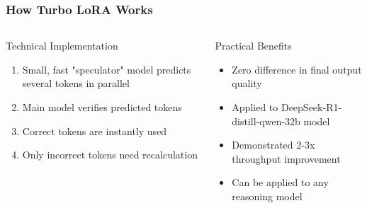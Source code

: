 \documentclass[aspectratio=169]{beamer}
\begin{document}
\begin{frame}[shrink=20]
	\frametitle{How Turbo LoRA Works}
	\begin{columns}[T]
		\begin{column}{0.48\textwidth}
			\begin{block}{Technical Implementation}
				\begin{enumerate}\setlength{\itemsep}{0.5em}
					\item Small, fast "speculator" model predicts several tokens in parallel
					\item Main model verifies predicted tokens
					\item Correct tokens are instantly used
					\item Only incorrect tokens need recalculation
				\end{enumerate}
			\end{block}
		\end{column}
		\begin{column}{0.48\textwidth}
			\begin{block}{Practical Benefits}
				\begin{itemize}\setlength{\itemsep}{0.5em}
					\item Zero difference in final output quality
					\item Applied to DeepSeek-R1-distill-qwen-32b model
					\item Demonstrated 2-3x throughput improvement
					\item Can be applied to any reasoning model
				\end{itemize}
			\end{block}
		\end{column}
	\end{columns}
	\vspace{0.2cm}
	\begin{center}
	\end{center}
\end{frame}
\end{document}
